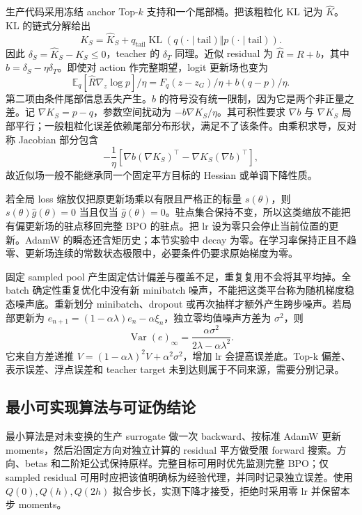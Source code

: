 \documentclass[lang=cn,scheme=chinese,openany]{../book/elegantbook}
\newcommand{\E}{\mathbb E}
\newcommand{\KL}{\operatorname{KL}}
\newcommand{\tail}{\mathrm{tail}}
\begin{document}
生产代码采用冻结 anchor Top-$k$ 支持和一个尾部桶。把该粗粒化 KL 记为 $\widehat K$。KL 的链式分解给出
\begin{equation}
K_S=\widehat K_S+q_{\tail}\KL(q(\cdot\mid\tail)\Vert p(\cdot\mid\tail)).
\end{equation}
因此 $\delta_S=\widehat K_S-K_S\le0$，teacher 的 $\delta_T$ 同理。近似 residual 为 $\widehat R=R+b$，其中 $b=\delta_S-\eta\delta_T$。即使对 action 作完整期望，logit 更新场也变为
\begin{equation}
\E_q[\widehat R\nabla_z\log p]/\eta
=F_q(z-z_G)/\eta+b(q-p)/\eta.
\end{equation}
第二项由条件尾部信息丢失产生。$b$ 的符号没有统一限制，因为它是两个非正量之差。记 $\nabla K_S=p-q$，参数空间扰动为 $-b\nabla K_S/\eta$。其可积性要求 $\nabla b$ 与 $\nabla K_S$ 局部平行；一般粗粒化误差依赖尾部分布形状，满足不了该条件。由乘积求导，反对称 Jacobian 部分包含
\begin{equation}
-\frac1\eta\left[\nabla b(\nabla K_S)^\top-
\nabla K_S(\nabla b)^\top\right],
\end{equation}
故近似场一般不能继承同一个固定平方目标的 Hessian 或单调下降性质。

若全局 loss 缩放仅把原更新场乘以有限且严格正的标量 $s(\theta)$，则 $s(\theta)\widehat g(\theta)=0$ 当且仅当 $\widehat g(\theta)=0$。驻点集合保持不变，所以这类缩放不能把有偏更新场的驻点移回完整 BPO 的驻点。把 lr 设为零只会停止当前位置的更新。AdamW 的瞬态还含矩历史；本节实验中 decay 为零。在学习率保持正且不趋零、更新场连续的常数状态极限中，必要条件仍要求原始梯度为零。

固定 sampled pool 产生固定估计偏差与覆盖不足，重复复用不会将其平均掉。全 batch 确定性重复优化中没有新 minibatch 噪声，不能把这类平台称为随机梯度稳态噪声底。重新划分 minibatch、dropout 或再次抽样才额外产生跨步噪声。若局部更新为 $e_{n+1}=(1-\alpha\lambda)e_n-\alpha\xi_n$，独立零均值噪声方差为 $\sigma^2$，则
\begin{equation}
\operatorname{Var}(e)_\infty=\frac{\alpha\sigma^2}{2\lambda-\alpha\lambda^2}.
\end{equation}
它来自方差递推 $V=(1-\alpha\lambda)^2V+\alpha^2\sigma^2$，增加 lr 会提高误差底。Top-k 偏差、表示误差、浮点误差和 teacher target 未到达则属于不同来源，需要分别记录。

\subsection{最小可实现算法与可证伪结论}

最小算法是对未变换的生产 surrogate 做一次 backward、按标准 AdamW 更新 moments，然后沿固定方向对独立计算的 residual 平方做受限 forward 搜索。方向、betas 和二阶矩公式保持原样。完整目标可用时优先监测完整 BPO；仅 sampled residual 可用时应把该值明确标为经验代理，并同时记录独立误差。使用 $Q(0),Q(h),Q(2h)$ 拟合步长，实测下降才接受，拒绝时采用零 lr 并保留本步 moments。
\end{document}

